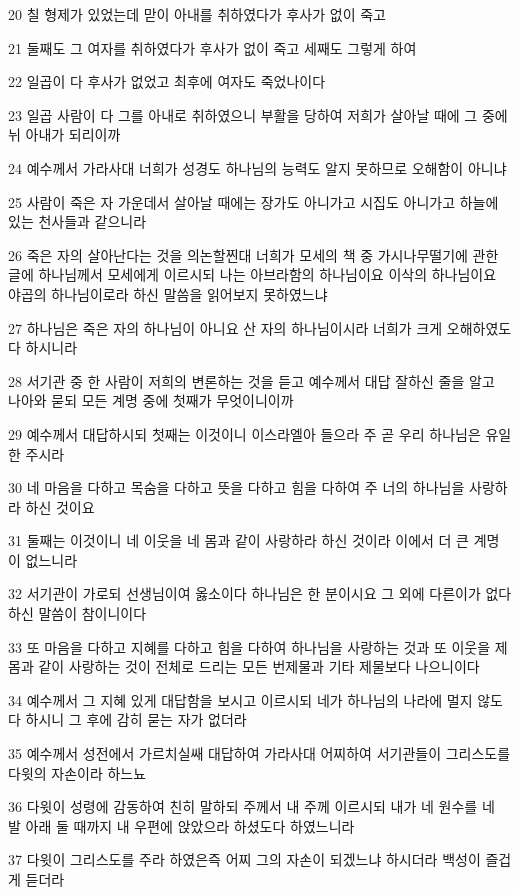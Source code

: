 \par 20 칠 형제가 있었는데 맏이 아내를 취하였다가 후사가 없이 죽고
\par 21 둘째도 그 여자를 취하였다가 후사가 없이 죽고 세째도 그렇게 하여
\par 22 일곱이 다 후사가 없었고 최후에 여자도 죽었나이다
\par 23 일곱 사람이 다 그를 아내로 취하였으니 부활을 당하여 저희가 살아날 때에 그 중에 뉘 아내가 되리이까
\par 24 예수께서 가라사대 너희가 성경도 하나님의 능력도 알지 못하므로 오해함이 아니냐
\par 25 사람이 죽은 자 가운데서 살아날 때에는 장가도 아니가고 시집도 아니가고 하늘에 있는 천사들과 같으니라
\par 26 죽은 자의 살아난다는 것을 의논할찐대 너희가 모세의 책 중 가시나무떨기에 관한 글에 하나님께서 모세에게 이르시되 나는 아브라함의 하나님이요 이삭의 하나님이요 야곱의 하나님이로라 하신 말씀을 읽어보지 못하였느냐
\par 27 하나님은 죽은 자의 하나님이 아니요 산 자의 하나님이시라 너희가 크게 오해하였도다 하시니라
\par 28 서기관 중 한 사람이 저희의 변론하는 것을 듣고 예수께서 대답 잘하신 줄을 알고 나아와 묻되 모든 계명 중에 첫째가 무엇이니이까
\par 29 예수께서 대답하시되 첫째는 이것이니 이스라엘아 들으라 주 곧 우리 하나님은 유일한 주시라
\par 30 네 마음을 다하고 목숨을 다하고 뜻을 다하고 힘을 다하여 주 너의 하나님을 사랑하라 하신 것이요
\par 31 둘째는 이것이니 네 이웃을 네 몸과 같이 사랑하라 하신 것이라 이에서 더 큰 계명이 없느니라
\par 32 서기관이 가로되 선생님이여 옳소이다 하나님은 한 분이시요 그 외에 다른이가 없다 하신 말씀이 참이니이다
\par 33 또 마음을 다하고 지혜를 다하고 힘을 다하여 하나님을 사랑하는 것과 또 이웃을 제 몸과 같이 사랑하는 것이 전체로 드리는 모든 번제물과 기타 제물보다 나으니이다
\par 34 예수께서 그 지혜 있게 대답함을 보시고 이르시되 네가 하나님의 나라에 멀지 않도다 하시니 그 후에 감히 묻는 자가 없더라
\par 35 예수께서 성전에서 가르치실쌔 대답하여 가라사대 어찌하여 서기관들이 그리스도를 다윗의 자손이라 하느뇨
\par 36 다윗이 성령에 감동하여 친히 말하되 주께서 내 주께 이르시되 내가 네 원수를 네 발 아래 둘 때까지 내 우편에 앉았으라 하셨도다 하였느니라
\par 37 다윗이 그리스도를 주라 하였은즉 어찌 그의 자손이 되겠느냐 하시더라 백성이 즐겁게 듣더라
